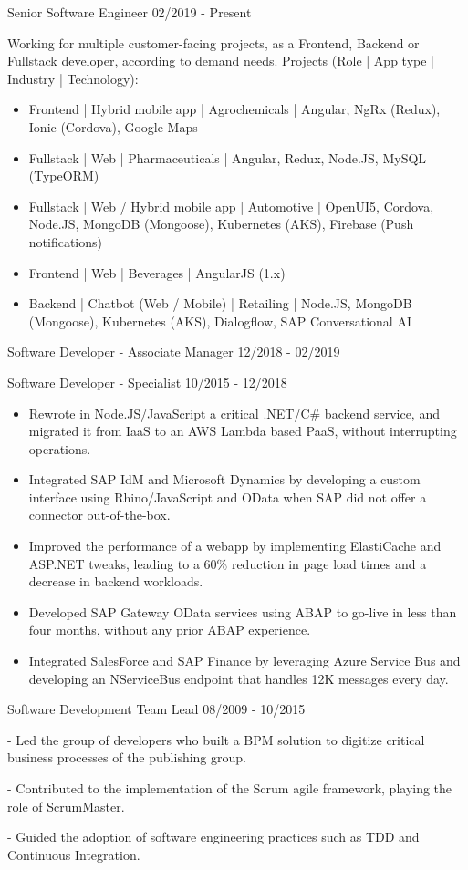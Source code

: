 \documentclass[11pt]{article} %
\begin{document}
\begin{description}
\squish
{}
           {Senior Software Engineer}
           {02/2019 - Present}

Working for multiple customer-facing projects, as a Frontend, Backend or Fullstack developer, according to demand needs.
\vskip 0.1in
Projects (Role | App type | Industry | Technology):
\begin{itemize}
\item Frontend | Hybrid mobile app | Agrochemicals | Angular, NgRx (Redux), Ionic (Cordova), Google Maps
\item Fullstack | Web | Pharmaceuticals | Angular, Redux, Node.JS, MySQL (TypeORM)
\item Fullstack | Web / Hybrid mobile app | Automotive | OpenUI5, Cordova, Node.JS, MongoDB (Mongoose), Kubernetes (AKS), Firebase (Push notifications)
\item Frontend | Web | Beverages | AngularJS (1.x)
\item Backend | Chatbot (Web / Mobile) | Retailing | Node.JS, MongoDB (Mongoose), Kubernetes (AKS), Dialogflow, SAP Conversational AI
\end{itemize}

           {Software Developer - Associate Manager}
           {12/2018 - 02/2019}

           {Software Developer - Specialist}
           {10/2015 - 12/2018}

\begin{itemize}
\item Rewrote in Node.JS/JavaScript a critical .NET/C\# backend service, and migrated it from IaaS to an AWS Lambda based PaaS, without interrupting operations.
\item Integrated SAP IdM and Microsoft Dynamics by developing a custom interface using Rhino/JavaScript and OData when SAP did not offer a connector out-of-the-box.
\item Improved the performance of a webapp by implementing ElastiCache and ASP.NET tweaks, leading to a 60\% reduction in page load times and a decrease in backend workloads.
\item Developed SAP Gateway OData services using ABAP to go-live in less than four months, without any prior ABAP experience.
\item Integrated SalesForce and SAP Finance by leveraging Azure Service Bus and developing an NServiceBus endpoint that handles 12K messages every day.
\end{itemize}

           {Software Development Team Lead}
           {08/2009 - 10/2015}

- Led the group of developers who built a BPM solution to digitize critical business processes of the publishing group.

- Contributed to the implementation of the Scrum agile framework, playing the role of ScrumMaster.

- Guided the adoption of software engineering practices such as TDD and Continuous Integration.

\end{description}
\end{document}
